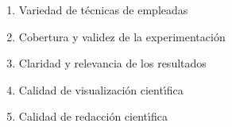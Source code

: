 \begin{enumerate}[itemsep=-1pt]
\item{Variedad de t\'{e}cnicas de empleadas}
\item{Cobertura y validez de la experimentaci\'{o}n}
\item{Claridad y relevancia de los resultados}    
\item{Calidad de visualizaci\'{o}n cient\'{\i}fica}
\item{Calidad de redacci\'{o}n cient\'{\i}fica}
\end{enumerate}
